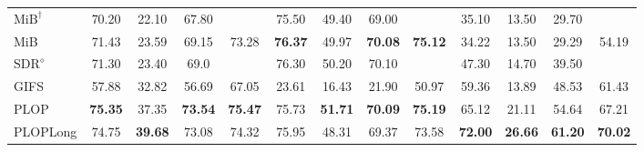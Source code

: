 \begin{table*}[t]
\begin{adjustbox}{max width=\textwidth}
\begin{tabular}{@{}l|cccc||cccc||cccc@{}}
            $\text{MiB}^\dagger$ \citep{cermelli2020modelingthebackground} & 70.20                                       & 22.10                                       & 67.80                                       &                & 75.50             & 49.40          & 69.00             &                & 35.10             & 13.50             & 29.70             &                \\
            MiB \citep{cermelli2020modelingthebackground}                  & 71.43                                       & 23.59                                       & 69.15                                       & 73.28          & \textbf{76.37}    & 49.97          & \textbf{70.08}    & \textbf{75.12} & 34.22             & 13.50             & 29.29             & 54.19          \\
            $\text{SDR}^\diamond$ \citep{michieli2021sdr}                  & 71.30                                       & 23.40                                       & 69.0                                        &                & 76.30             & 50.20          & 70.10             &                & 47.30             & 14.70             & 39.50             &                \\
            GIFS \citep{cermelli2020fewshotcontinualsegm}                  & 57.88                                       & 32.82                                       & 56.69                                       & 67.05          & 23.61             & 16.43          & 21.90             & 50.97          & 59.36             & 13.89             & 48.53             & 61.43          \\
            \hdashline
            PLOP                                                           & \textbf{75.35}                              & 37.35                                       & \textbf{73.54}                              & \textbf{75.47} & 75.73             & \textbf{51.71} & \textbf{70.09}    & \textbf{75.19} & 65.12             & 21.11             & 54.64             & 67.21          \\
            PLOPLong                                                       & 74.75                                       & \textbf{39.68}                              & 73.08                                       & 74.32          & 75.95             & 48.31          & 69.37             & 73.58          & \textbf{72.00}    & \textbf{26.66}    & \textbf{61.20}    & \textbf{70.02} \\

\end{tabular}
\end{adjustbox}
\end{table*}

